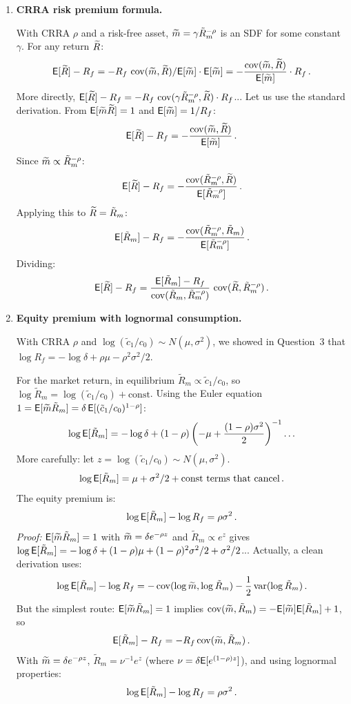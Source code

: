 \begin{enumerate}
\item \textbf{CRRA risk premium formula.}

With CRRA $\rho$ and a risk-free asset, $\widetilde{m} = \gamma\tilde{R}_m^{-\rho}$ is an SDF for some constant $\gamma$.  For any return $\widetilde{R}$:
\[
\mathsf{E}[\widetilde{R}]-R_f = -R_f\,\operatorname{cov}(\widetilde{m},\widetilde{R})/\mathsf{E}[\widetilde{m}]\cdot\mathsf{E}[\widetilde{m}] = -\frac{\operatorname{cov}(\widetilde{m},\widetilde{R})}{\mathsf{E}[\widetilde{m}]}\cdot R_f\,.
\]
More directly, $\mathsf{E}[\widetilde{R}]-R_f = -R_f\,\operatorname{cov}(\gamma\tilde{R}_m^{-\rho},\widetilde{R}) \cdot R_f$... Let us use the standard derivation.  From $\mathsf{E}[\widetilde{m}\widetilde{R}]=1$ and $\mathsf{E}[\widetilde{m}]=1/R_f$:
\[
\mathsf{E}[\widetilde{R}]-R_f = -\frac{\operatorname{cov}(\widetilde{m},\widetilde{R})}{\mathsf{E}[\widetilde{m}]}\,.
\]
Since $\widetilde{m} \propto \tilde{R}_m^{-\rho}$:
\[
\mathsf{E}[\widetilde{R}]-R_f = -\frac{\operatorname{cov}(\tilde{R}_m^{-\rho},\widetilde{R})}{\mathsf{E}[\tilde{R}_m^{-\rho}]}\,.
\]
Applying this to $\widetilde{R} = \tilde{R}_m$:
\[
\mathsf{E}[\tilde{R}_m]-R_f = -\frac{\operatorname{cov}(\tilde{R}_m^{-\rho},\tilde{R}_m)}{\mathsf{E}[\tilde{R}_m^{-\rho}]}\,.
\]
Dividing:
\[
\mathsf{E}[\widetilde{R}]-R_f = \frac{\mathsf{E}[\tilde{R}_m]-R_f}{\operatorname{cov}(\tilde{R}_m,\tilde{R}_m^{-\rho})}\,\operatorname{cov}(\widetilde{R},\tilde{R}_m^{-\rho})\,.
\]

\item \textbf{Equity premium with lognormal consumption.}

With CRRA $\rho$ and $\log(\tilde{c}_1/c_0)\sim N(\mu,\sigma^2)$, we showed in Question~3 that $\log R_f = -\log\delta+\rho\mu-\rho^2\sigma^2/2$.

For the market return, in equilibrium $\tilde{R}_m \propto \tilde{c}_1/c_0$, so $\log\tilde{R}_m = \log(\tilde{c}_1/c_0)+\text{const}$.  Using the Euler equation $1 = \mathsf{E}[\widetilde{m}\tilde{R}_m] = \delta\,\mathsf{E}[(\tilde{c}_1/c_0)^{1-\rho}]$:
\[
\log\mathsf{E}[\tilde{R}_m] = -\log\delta + (1-\rho)\left(-\mu+\frac{(1-\rho)\sigma^2}{2}\right)^{-1}\ldots
\]
More carefully: let $z = \log(\tilde{c}_1/c_0)\sim N(\mu,\sigma^2)$.
\[
\log\mathsf{E}[\tilde{R}_m] = \mu + \sigma^2/2 + \text{const terms that cancel}\,.
\]
The equity premium is:
\[
\log\mathsf{E}[\tilde{R}_m] - \log R_f = \rho\sigma^2\,.
\]
\textit{Proof:} $\mathsf{E}[\widetilde{m}\tilde{R}_m]=1$ with $\widetilde{m} = \delta e^{-\rho z}$ and $\tilde{R}_m \propto e^z$ gives $\log\mathsf{E}[\tilde{R}_m] = -\log\delta+(1-\rho)\mu+(1-\rho)^2\sigma^2/2 + \sigma^2/2$... Actually, a clean derivation uses:
\[
\log\mathsf{E}[\tilde{R}_m] - \log R_f = -\operatorname{cov}(\log\widetilde{m},\log\tilde{R}_m) - \frac{1}{2}\operatorname{var}(\log\tilde{R}_m)\,.
\]
But the simplest route: $\mathsf{E}[\widetilde{m}\tilde{R}_m]=1$ implies $\operatorname{cov}(\widetilde{m},\tilde{R}_m)=-\mathsf{E}[\widetilde{m}]\mathsf{E}[\tilde{R}_m]+1$, so
\[
\mathsf{E}[\tilde{R}_m]-R_f = -R_f\operatorname{cov}(\widetilde{m},\tilde{R}_m)\,.
\]
With $\widetilde{m}=\delta e^{-\rho z}$, $\tilde{R}_m = \nu^{-1}e^z$ (where $\nu=\delta\mathsf{E}[e^{(1-\rho)z}]$), and using lognormal properties:
\[
\log\mathsf{E}[\tilde{R}_m]-\log R_f = \rho\sigma^2\,.
\]


\end{enumerate}
